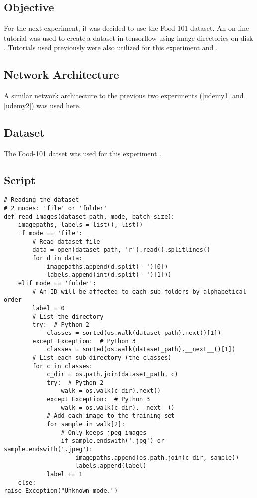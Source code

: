 \subsection*{Objective}
For the next experiment, it was decided to use the Food-101 dataset.
An on line tutorial was used to create a dataset in tensorflow using image directories on disk \parencite{file_dir_code}.
Tutorials used previously were also utilized for this experiment \parencite{udemy} and \parencite{cifar}.

\subsection*{Network Architecture}
A similar network architecture to the previous two experiments (\ref{udemy1} and \ref{udemy2}) was used here.

\subsection*{Dataset}
The Food-101 datset was used for this experiment \parencite{food101}.

\subsection*{Script}
\begin{lstlisting}[style=Python]
# Reading the dataset
# 2 modes: 'file' or 'folder'
def read_images(dataset_path, mode, batch_size):
    imagepaths, labels = list(), list()
    if mode == 'file':
        # Read dataset file
        data = open(dataset_path, 'r').read().splitlines()
        for d in data:
            imagepaths.append(d.split(' ')[0])
            labels.append(int(d.split(' ')[1]))
    elif mode == 'folder':
        # An ID will be affected to each sub-folders by alphabetical order
        label = 0
        # List the directory
        try:  # Python 2
            classes = sorted(os.walk(dataset_path).next()[1])
        except Exception:  # Python 3
            classes = sorted(os.walk(dataset_path).__next__()[1])
        # List each sub-directory (the classes)
        for c in classes:
            c_dir = os.path.join(dataset_path, c)
            try:  # Python 2
                walk = os.walk(c_dir).next()
            except Exception:  # Python 3
                walk = os.walk(c_dir).__next__()
            # Add each image to the training set
            for sample in walk[2]:
                # Only keeps jpeg images
                if sample.endswith('.jpg') or sample.endswith('.jpeg'):
                    imagepaths.append(os.path.join(c_dir, sample))
                    labels.append(label)
            label += 1
    else:
raise Exception("Unknown mode.")
\end{lstlisting}

